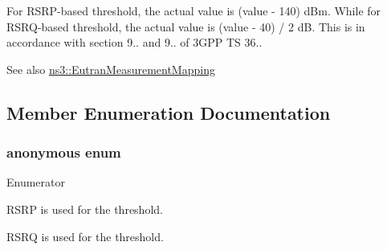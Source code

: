 For R\+S\+R\+P-\/based threshold, the actual value is (value -\/ 140) d\+Bm. While for R\+S\+R\+Q-\/based threshold, the actual value is (value -\/ 40) / 2 dB. This is in accordance with section 9.. and 9.. of 3\+G\+PP TS 36..

\begin{DoxySeeAlso}{See also}
\hyperlink{classns3_1_1EutranMeasurementMapping}{ns3\+::\+Eutran\+Measurement\+Mapping} 
\end{DoxySeeAlso}


\subsection{Member Enumeration Documentation}
\subsubsection[{\texorpdfstring{anonymous enum}{anonymous enum}}]{\setlength{\rightskip}{0pt plus 5cm}anonymous enum}\hypertarget{structns3_1_1LteRrcSap_1_1ThresholdEutra_ad3ed2704b836132980dd2e97cb03822c}{}\label{structns3_1_1LteRrcSap_1_1ThresholdEutra_ad3ed2704b836132980dd2e97cb03822c}
\begin{Desc}
\item[Enumerator]\par
\begin{description}
\item[{\em 
T\+H\+R\+E\+S\+H\+O\+L\+D\+\_\+\+R\+S\+RP\hypertarget{structns3_1_1LteRrcSap_1_1ThresholdEutra_ad3ed2704b836132980dd2e97cb03822ca0663d5baa9382bd755acb712f6ebf707}{}\label{structns3_1_1LteRrcSap_1_1ThresholdEutra_ad3ed2704b836132980dd2e97cb03822ca0663d5baa9382bd755acb712f6ebf707}
}]R\+S\+RP is used for the threshold. \item[{\em 
T\+H\+R\+E\+S\+H\+O\+L\+D\+\_\+\+R\+S\+RQ\hypertarget{structns3_1_1LteRrcSap_1_1ThresholdEutra_ad3ed2704b836132980dd2e97cb03822ca6e8bda2b99825f09f53388c29b6402b4}{}\label{structns3_1_1LteRrcSap_1_1ThresholdEutra_ad3ed2704b836132980dd2e97cb03822ca6e8bda2b99825f09f53388c29b6402b4}
}]R\+S\+RQ is used for the threshold. \end{description}
\end{Desc}


